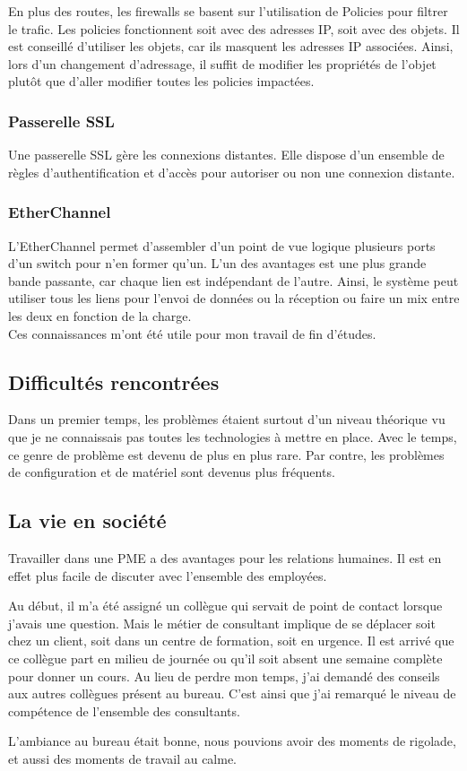 En plus des routes, les firewalls se basent sur l'utilisation de Policies pour filtrer le trafic.
Les policies fonctionnent soit avec des adresses IP, soit avec des objets. 
Il est conseillé d'utiliser les objets, car ils masquent les adresses IP associées. 
Ainsi, lors d'un changement d'adressage, il suffit de modifier les propriétés de l'objet plutôt que d'aller modifier toutes les policies impactées.
\subsubsection{Passerelle SSL}
Une passerelle SSL gère les connexions distantes.
Elle dispose d'un ensemble de règles d'authentification et d'accès pour autoriser ou non une connexion distante.

\subsubsection{EtherChannel}
L'EtherChannel permet d'assembler d'un point de vue logique plusieurs ports d'un switch pour n'en former qu'un.
L'un des avantages est une plus grande bande passante, car chaque lien est indépendant de l'autre.
Ainsi, le système peut utiliser tous les liens pour l'envoi de données ou la réception ou faire un mix entre les deux en fonction de la charge. \\

Ces connaissances m'ont été utile pour mon travail de fin d'études. 

\subsection{Difficultés rencontrées}
Dans un premier temps, les problèmes étaient surtout d'un niveau théorique vu que je ne connaissais pas toutes les technologies à mettre en place. Avec le temps, ce genre de problème est devenu de plus en plus rare.
Par contre, les problèmes de configuration et de matériel sont devenus plus fréquents.

\subsection{La vie en société}
Travailler dans une PME a des avantages pour les relations humaines.
Il est en effet plus facile de discuter avec l'ensemble des employées.

Au début, il m'a été assigné un collègue qui servait de point de contact lorsque j'avais une question.
Mais le métier de consultant implique de se déplacer soit chez un client, soit dans un centre de formation, soit en urgence.
Il est arrivé que ce collègue part en milieu de journée ou qu'il soit absent une semaine complète pour donner un cours.
Au lieu de perdre mon temps, j'ai demandé des conseils aux autres collègues présent au bureau.
C'est ainsi que j'ai remarqué le niveau de compétence de l'ensemble des consultants.

L'ambiance au bureau était bonne, nous pouvions avoir des moments de rigolade, et aussi des moments de travail au calme.